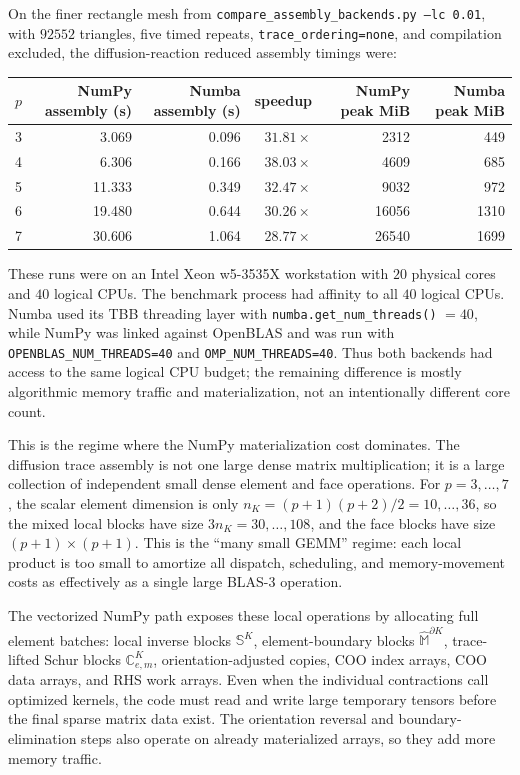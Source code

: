 \documentclass[11pt]{article}
\newcommand{\SK}{\mathbb S^K}
\newcommand{\C}{\mathbb C}
\newcommand{\Mbb}{\widehat{\mathbb M}}
\newcommand{\code}[1]{\texttt{#1}}
\begin{document}
On the finer rectangle mesh from
\code{compare\_assembly\_backends.py --lc 0.01}, with $92552$ triangles, five
timed repeats, \code{trace\_ordering=none}, and compilation excluded, the
diffusion-reaction reduced assembly timings were:
\begin{center}
\renewcommand{\arraystretch}{1.15}
\begin{tabular}{rrrrrr}
\toprule
$p$ & NumPy assembly (s) & Numba assembly (s) & speedup & NumPy peak MiB & Numba peak MiB \\
\midrule
3 & 3.069 & 0.096 & $31.81\times$ & 2312 & 449 \\
4 & 6.306 & 0.166 & $38.03\times$ & 4609 & 685 \\
5 & 11.333 & 0.349 & $32.47\times$ & 9032 & 972 \\
6 & 19.480 & 0.644 & $30.26\times$ & 16056 & 1310 \\
7 & 30.606 & 1.064 & $28.77\times$ & 26540 & 1699 \\
\bottomrule
\end{tabular}
\end{center}
These runs were on an Intel Xeon w5-3535X workstation with $20$ physical cores
and $40$ logical CPUs.  The benchmark process had affinity to all $40$ logical
CPUs.  Numba used its TBB threading layer with \code{numba.get\_num\_threads()}
$=40$, while NumPy was linked against OpenBLAS and was run with
\code{OPENBLAS\_NUM\_THREADS=40} and \code{OMP\_NUM\_THREADS=40}.  Thus both
backends had access to the same logical CPU budget; the remaining difference is
mostly algorithmic memory traffic and materialization, not an intentionally
different core count.

This is the regime where the NumPy materialization cost dominates.  The
diffusion trace assembly is not one large dense matrix multiplication; it is a
large collection of independent small dense element and face operations.  For
$p=3,\ldots,7$, the scalar element dimension is only
$n_K=(p+1)(p+2)/2=10,\ldots,36$, so the mixed local blocks have size
$3n_K=30,\ldots,108$, and the face blocks have size $(p+1)\times(p+1)$.  This
is the ``many small GEMM'' regime: each local product is too small to amortize
all dispatch, scheduling, and memory-movement costs as effectively as a single
large BLAS-3 operation.

The vectorized NumPy path exposes these local operations by allocating full
element batches: local inverse blocks $\SK$, element-boundary blocks
$\Mbb^{\partial K}$, trace-lifted Schur blocks $\C_{e,m}^K$, orientation-adjusted
copies, COO index arrays, COO data arrays, and RHS work arrays.  Even when the
individual contractions call optimized kernels, the code must read and write
large temporary tensors before the final sparse matrix data exist.  The
orientation reversal and boundary-elimination steps also operate on already
materialized arrays, so they add more memory traffic.
\end{document}
